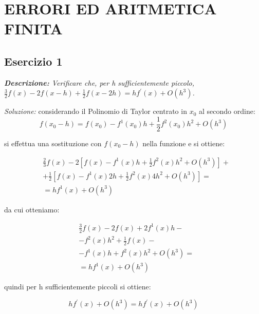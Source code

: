 \chapter{ERRORI ED ARITMETICA FINITA}
\section{Esercizio 1}
\textit{\textbf{Descrizione:} Verificare che, per h sufficientemente piccolo, $\frac{3}{2}f(x)-2f(x-h)+\frac{1}{2}f(x-2h)= hf^{'}(x)+ O(h^{3})$.}\newline

\noindent\emph{Soluzione: }\newline
considerando il Polinomio di Taylor centrato in  $x_{0}$ al secondo ordine:
\begin{equation}
	 f(x_{0} - h) = f(x_{0}) - f^{1}(x_{0})h + \frac{1}{2}f^{2}(x_{0})h^{2}+O(h^{3})
\end{equation}

si effettua una sostituzione con $f(x_{0} - h)$  nella funzione e si ottiene:

\begin{equation}
  \begin{aligned}
      & \frac{2}{3}f(x) - 2\left [ f(x)-f^{1}(x)h+\frac{1}{2}f^{2}(x)h^{2}+O(h^{3}) \right ] + \\
      & +   \frac{1}{2} \left [f(x)-f^{1}(x)2h+\frac{1}{2}f^{2}(x)4h^{2}+O(h^{3})  \right ] = \\
      & = hf^{1}(x)+O(h^{3})
  \end{aligned}
\end{equation}

da cui otteniamo:

\begin{equation}
  \begin{aligned}
      & \frac{3}{2}f(x)-2f(x)+2f^{1}(x)h - \\
      &  - f^{2}(x)h^{2}+\frac{1}{2}f(x) - \\
      &  - f^{1}(x)h+f^{2}(x)h^{2}+O(h^{3}) = \\
      &  = hf^{1}(x)+O(h^{3})
  \end{aligned}
\end{equation}

quindi per h sufficientemente piccoli si ottiene:\newline

\begin{equation}
	 hf^{'}(x)+ O(h^{3}) = hf^{'}(x)+ O(h^{3})
\end{equation}
\newline